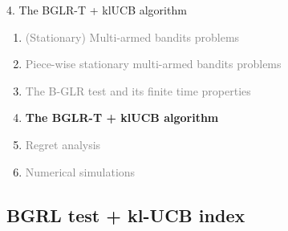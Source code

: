 \documentclass[11pt,english,ignorenonframetext,]{beamer}
\begin{document}
\begin{frame}{4. The BGLR-T + klUCB algorithm}

  \begin{enumerate}
    \item
    \textcolor{gray}{
      (Stationary) Multi-armed bandits problems
    }
    \vspace*{15pt}

    \item
    \textcolor{gray}{
      Piece-wise stationary multi-armed bandits problems
    }
    \vspace*{15pt}

    \item
    \textcolor{gray}{
      The B-GLR test and its finite time properties
    }
    \vspace*{15pt}

    \item
    \alert{\textbf{%
      The BGLR-T + klUCB algorithm
    }}
    \vspace*{15pt}

    \item
    \textcolor{gray}{
      Regret analysis
    }
    \vspace*{15pt}

    \item
    \textcolor{gray}{
      Numerical simulations
    }
  \end{enumerate}

\end{frame}

\subsection{\hfill{}BGRL test + kl-UCB index\hfill{}}
\end{document}
